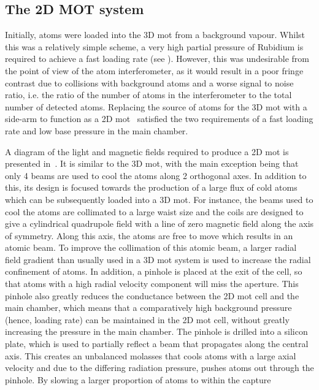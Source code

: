 \subsection{The 2D MOT system}\label{sec:2d_mot}
Initially, atoms were loaded into the 3D \ac{mot} from a background vapour.
Whilst this was a relatively simple scheme, a very high partial pressure of
Rubidium is required to achieve a fast loading rate (see
). However, this was undesirable from the
point of view of the atom interferometer, as it would result in a poor fringe
contrast due to collisions with background atoms and a worse signal to noise
ratio, i.e. the ratio of the number of atoms in the interferometer to the
total number of detected atoms. Replacing the source of atoms for the 3D
\ac{mot} with a side-arm to function as a 2D \ac{mot}~\cite{Dieckmann1998}
satisfied the two requirements of a fast loading rate and low base pressure
in the main chamber. \par\noindent
A diagram of the light and magnetic fields required to produce a 2D \ac{mot} is presented
in~. It is similar to the 3D \ac{mot}, with the
main exception being that only 4 beams are used to cool the atoms along 2
orthogonal axes. In addition to this, its design is focused towards the
production of a large flux of cold atoms which can be subsequently loaded
into a 3D \ac{mot}. For instance, the beams used to cool the atoms are
collimated to a large waist size and the coils are designed to give a
cylindrical quadrupole field with a line of zero magnetic field along the
axis of symmetry. Along this axis, the atoms are free to move which results
in an atomic beam. To improve the collimation of this atomic beam, a larger
radial field gradient than usually used in a 3D \ac{mot} system is used to
increase the radial confinement of atoms. In addition, a pinhole is placed at
the exit of the cell, so that atoms with a high radial velocity component
will miss the aperture. This pinhole also greatly reduces the conductance
between the 2D \ac{mot} cell and the main chamber, which means that a
comparatively high background pressure (hence, loading rate) can be
maintained in the 2D \ac{mot} cell, without greatly increasing the pressure
in the main chamber. The pinhole is drilled into a silicon plate, which is
used to partially reflect a beam that propagates along the central axis. This
creates an unbalanced molasses that cools atoms with a large axial velocity
and due to the differing radiation pressure, pushes atoms out through the
pinhole. By slowing a larger proportion of atoms to within the capture
